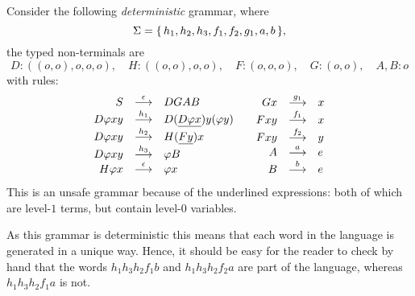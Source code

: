 \begin{example}\label{ex:ex1}
Consider the following \emph{deterministic} grammar, where
\[\Sigma = \{\,{h_1, h_2, h_3, f_1, f_2, g_1, a, b}\,\},\]
the typed non-terminals are
\[D : ((o, o), o, o, o), \quad H : ((o, o), o, o), \quad
F: (o, o, o), \quad G : (o, o), \quad A, B : o\] with rules:
\begin{equation}
\begin{array}{cc}
\begin{array}{rcl}
\nonumber S & \stackrel{{\epsilon}}{\longrightarrow} & DGAB\\
\nonumber D\varphi x y & \stackrel{{h_1}}{\longrightarrow} & D (\underline{D \varphi x}) y (\varphi y) \\
\nonumber D\varphi x y & \stackrel{{h_2}}{\longrightarrow} & H (\underline{F y}) x \\
\nonumber D\varphi x y & \stackrel{{h_3}}{\longrightarrow} & \varphi B \\
\nonumber H \varphi x & \stackrel{{\epsilon}}{\longrightarrow} & \varphi x
\end{array} &
\begin{array}{rcl}
\nonumber G x & \stackrel{{g_1}}{\longrightarrow} & x \\
\nonumber F x y & \stackrel{{f_1}}{\longrightarrow} & x \\
\nonumber F x y & \stackrel{{f_2}}{\longrightarrow} & y \\
\nonumber A & \stackrel{{a}}{\longrightarrow} & e\\
\nonumber B & \stackrel{{b}}{\longrightarrow} & e
\end{array}
\end{array}
\end{equation}
This is an unsafe grammar because of the underlined expressions:
both of which are level-$1$ terms, but contain level-$0$
variables.

As this grammar is deterministic \cite{dMO} this means that each
word in the language is generated in a unique way. Hence, it
should be easy for the reader to check by hand that the words
$h_1h_3h_2f_1b$ and $h_1h_3h_2f_2a$ are part of the language,
whereas $h_1h_3h_2f_1a$ is not.
\end{example}


